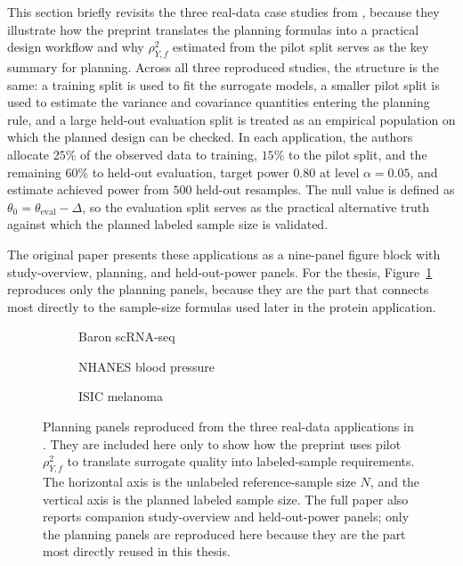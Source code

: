 This section briefly revisits the three real-data case studies from \textcite{ppi_power}, because they illustrate how the preprint translates the planning formulas into a practical design workflow and why \(\rho_{Y,f}^2\) estimated from the pilot split serves as the key summary for planning. Across all three reproduced studies, the structure is the same: a training split is used to fit the surrogate models, a smaller pilot split is used to estimate the variance and covariance quantities entering the planning rule, and a large held-out evaluation split is treated as an empirical population on which the planned design can be checked. In each application, the authors allocate $25\%$ of the observed data to training, $15\%$ to the pilot split, and the remaining $60\%$ to held-out evaluation, target power $0.80$ at level $\alpha=0.05$, and estimate achieved power from $500$ held-out resamples. The null value is defined as $\theta_0=\theta_{\mathrm{eval}}-\Delta$, so the evaluation split serves as the practical alternative truth against which the planned labeled sample size is validated.

The original paper presents these applications as a nine-panel figure block with study-overview, planning, and held-out-power panels. For the thesis, Figure~\ref{fig:chap3_real_data_planning} reproduces only the planning panels, because they are the part that connects most directly to the sample-size formulas used later in the protein application.

\begin{figure}[htbp]
\centering
\begin{subfigure}[t]{0.32\textwidth}
    \centering
    \caption{Baron scRNA-seq}
\end{subfigure}\hfill
\begin{subfigure}[t]{0.32\textwidth}
    \centering
    \caption{NHANES blood pressure}
\end{subfigure}\hfill
\begin{subfigure}[t]{0.32\textwidth}
    \centering
    \caption{ISIC melanoma}
\end{subfigure}
\caption[Real-data planning curves from the three case studies]{Planning panels reproduced from the three real-data applications in \textcite{ppi_power}. They are included here only to show how the preprint uses pilot $\rho_{Y,f}^2$ to translate surrogate quality into labeled-sample requirements. The horizontal axis is the unlabeled reference-sample size \(N\), and the vertical axis is the planned labeled sample size. The full paper also reports companion study-overview and held-out-power panels; only the planning panels are reproduced here because they are the part most directly reused in this thesis.}
\label{fig:chap3_real_data_planning}
\end{figure}

